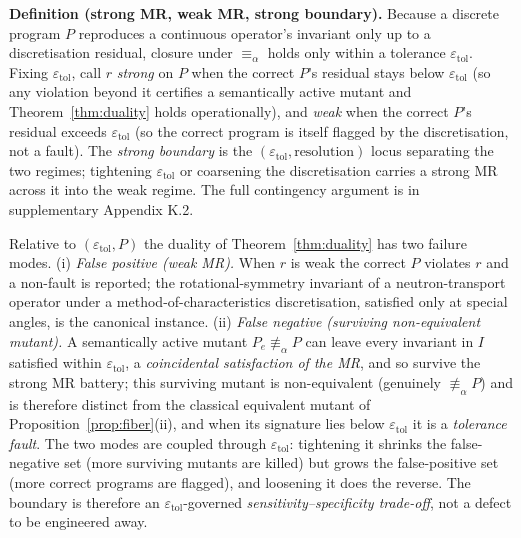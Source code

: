 \documentclass[manuscript,screen,review]{acmart}
\begin{document}
\textbf{Definition (strong MR, weak MR, strong boundary).} Because a discrete
program $P$ reproduces a continuous operator's invariant only up to a
discretisation residual, closure under $\equiv_\alpha$ holds only within a
tolerance $\varepsilon_{\mathrm{tol}}$. Fixing $\varepsilon_{\mathrm{tol}}$,
call $r$ \emph{strong} on $P$ when the correct $P$'s residual stays below
$\varepsilon_{\mathrm{tol}}$ (so any violation beyond it certifies a
semantically active mutant and Theorem~\ref{thm:duality} holds operationally),
and \emph{weak} when the correct $P$'s residual exceeds
$\varepsilon_{\mathrm{tol}}$ (so the correct program is itself flagged by the
discretisation, not a fault). The \emph{strong boundary} is the
$(\varepsilon_{\mathrm{tol}}, \text{resolution})$ locus separating the two
regimes; tightening $\varepsilon_{\mathrm{tol}}$ or coarsening the
discretisation carries a strong MR across it into the weak regime. The full
contingency argument is in supplementary Appendix K.2.

\begin{proposition}\label{prop:boundary}
Relative to
$(\varepsilon_{\mathrm{tol}}, P)$ the duality of Theorem~\ref{thm:duality} has two
failure modes. (i) \emph{False positive (weak MR).} When $r$ is weak the
correct $P$ violates $r$ and a non-fault is reported; the
rotational-symmetry invariant of a neutron-transport operator under a
method-of-characteristics discretisation, satisfied only at special
angles, is the canonical instance. (ii) \emph{False negative (surviving
non-equivalent mutant).} A semantically active mutant
$P_e \not\equiv_\alpha P$ can leave every invariant in $I$ satisfied
within $\varepsilon_{\mathrm{tol}}$, a \emph{coincidental satisfaction
of the MR}, and so survive the strong MR battery; this surviving mutant
is non-equivalent (genuinely $\not\equiv_\alpha P$) and is therefore
distinct from the classical equivalent mutant of Proposition~\ref{prop:fiber}(ii), and
when its signature lies below $\varepsilon_{\mathrm{tol}}$ it is a
\emph{tolerance fault}. The two modes are coupled through
$\varepsilon_{\mathrm{tol}}$: tightening it shrinks the false-negative
set (more surviving mutants are killed) but grows the false-positive set
(more correct programs are flagged), and loosening it does the reverse.
The boundary is therefore an $\varepsilon_{\mathrm{tol}}$-governed
\emph{sensitivity--specificity trade-off}, not a defect to be engineered
away.
\end{proposition}
\end{document}
